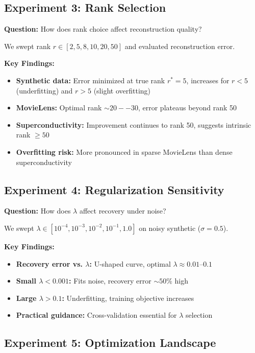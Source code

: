 \documentclass[11pt,a4paper]{article}
\begin{document}
\subsection{Experiment 3: Rank Selection}

\textbf{Question:} How does rank choice affect reconstruction quality?

We swept rank $r \in [2, 5, 8, 10, 20, 50]$ and evaluated reconstruction error.

\textbf{Key Findings:}
\begin{itemize}
  \item \textbf{Synthetic data:} Error minimized at true rank $r^* = 5$, increases for $r < 5$ (underfitting) and $r > 5$ (slight overfitting)
  \item \textbf{MovieLens:} Optimal rank $\sim 20--30$, error plateaus beyond rank 50
  \item \textbf{Superconductivity:} Improvement continues to rank 50, suggests intrinsic rank $\geq 50$
  \item \textbf{Overfitting risk:} More pronounced in sparse MovieLens than dense superconductivity
\end{itemize}

\subsection{Experiment 4: Regularization Sensitivity}

\textbf{Question:} How does $\lambda$ affect recovery under noise?

We swept $\lambda \in [10^{-4}, 10^{-3}, 10^{-2}, 10^{-1}, 1.0]$ on noisy synthetic ($\sigma = 0.5$).

\textbf{Key Findings:}
\begin{itemize}
  \item \textbf{Recovery error vs. $\lambda$:} U-shaped curve, optimal $\lambda \approx 0.01$--$0.1$
  \item \textbf{Small $\lambda < 0.001$:} Fits noise, recovery error $\sim 50\%$ high
  \item \textbf{Large $\lambda > 0.1$:} Underfitting, training objective increases
  \item \textbf{Practical guidance:} Cross-validation essential for $\lambda$ selection
\end{itemize}

\subsection{Experiment 5: Optimization Landscape}
\end{document}
